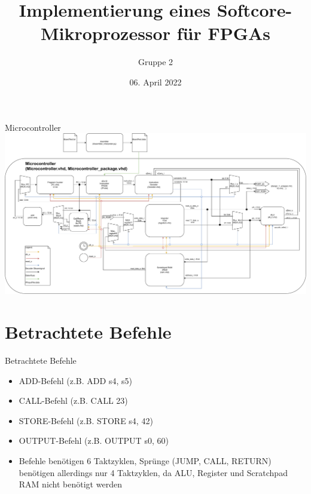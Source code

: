 \documentclass[10pt, t,
aspectratio=169,%
usenames,
dvipsnames,
]{beamer}
\title[Mikroprozessor Architektur] %
{Implementierung eines Softcore-Mikroprozessor für FPGAs}
\author[] %
{Gruppe 2}
\institute[] %
{
}
\date[] %
{06. April 2022}
\begin{document}
	\frame{\titlepage}
	\begin{frame}{Microcontroller}
		\includegraphics[width=.95\linewidth]{../Blockbeschreibungen/BlockdiagramMitVHDL.pdf}
	\end{frame}
	\section{Betrachtete Befehle}
	\begin{frame}{Betrachtete Befehle}
		\begin{itemize}
			\item ADD-Befehl (z.B. ADD s4, s5)
			\item CALL-Befehl (z.B. CALL 23)
			\item STORE-Befehl (z.B. STORE s4, 42)
			\item OUTPUT-Befehl (z.B. OUTPUT s0, 60)
			\item Befehle benötigen 6 Taktzyklen, Sprünge (JUMP, CALL, RETURN) benötigen allerdings nur 4 Taktzyklen, da ALU, Register und Scratchpad RAM nicht benötigt werden
		\end{itemize}
	\end{frame}
\end{document}
